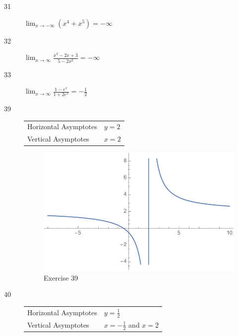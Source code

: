 \documentclass[letterpaper]{exam}
\begin{document}
\begin{description}
      \item[31] 
        $\lim_{x \to -\infty} \left( x^4 + x^5 \right) = \boxed{ -\infty }$

      \item[32] 
        $\lim_{x \to \infty} \frac{x^3 - 2x + 3}{5 - 2x^2} = \boxed{ -\infty }$

      \item[33] 
        $\lim_{x \to \infty} \frac{1 - e^x}{1 + 2e^x} = \boxed{ - \frac{1}{2} }$

      \item[39]
        \begin{tabular}[H]{ll}
          \toprule
          Horizontal Asymptotes & $y = 2$ \\
          Vertical Asymptotes   & $x = 2$ \\
          \bottomrule
        \end{tabular}

        \begin{figure}[H]
          \centering
          \includegraphics[scale = 0.5]{ex39.pdf}
          \caption{Exercise 39}
          \label{fig:ex39}
        \end{figure}

      \item[40]
        \begin{tabular}[H]{ll}
          \toprule
          Horizontal Asymptotes & $y = \frac{1}{2}$ \\
          Vertical Asymptotes   & $x = - \frac{1}{2}$ and $x = 2$ \\
          \bottomrule
        \end{tabular}


\end{description}
\end{document}
